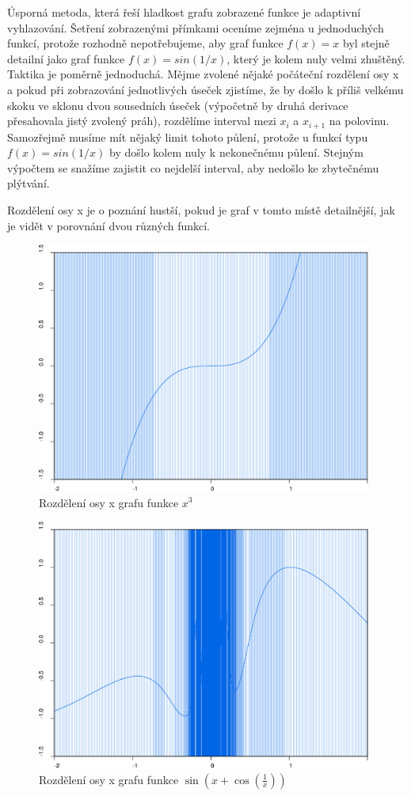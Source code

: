 \documentclass[11pt]{article}
\begin{document}
Úsporná metoda, která řeší hladkost grafu zobrazené funkce je adaptivní
vyhlazování. Šetření zobrazenými přímkami oceníme zejména u jednoduchých
funkcí, protože rozhodně nepotřebujeme, aby graf funkce $f(x) = x$ byl stejně
detailní jako graf funkce $f(x) = sin(1/x)$, který je kolem nuly velmi
zhuštěný. Taktika je poměrně jednoduchá. Mějme zvolené nějaké počáteční
rozdělení osy x a pokud při zobrazování jednotlivých úseček zjistíme, že by
došlo k příliš velkému skoku ve sklonu dvou sousedních úseček (výpočetně by
druhá derivace přesahovala jistý zvolený práh), rozdělíme interval mezi $x_i$
a $x_{i + 1}$ na polovinu. Samozřejmě musíme mít nějaký limit tohoto půlení,
protože u funkcí typu $f(x) = sin(1/x)$ by došlo kolem nuly k nekonečnému
půlení. Stejným výpočtem se snažíme zajistit co nejdelší interval, aby nedošlo
ke zbytečnému plýtvání. 

Rozdělení osy x je o poznání hustší, pokud je graf v tomto místě detailnější,
jak je vidět v porovnání dvou různých funkcí.

\begin{figure}[ht!]
\centering
	\includegraphics[width=11cm]{figures/figure2.eps}
	\caption{Rozdělení osy x grafu funkce $x^3$}
\end{figure}
\begin{figure}[ht!]
\centering
	\includegraphics[width=11cm]{figures/figure1.eps}
	\caption{Rozdělení osy x grafu funkce
		$\sin \left(x + \cos \left(\frac{1}{x} \right) \right)$}
\end{figure}
\end{document}
